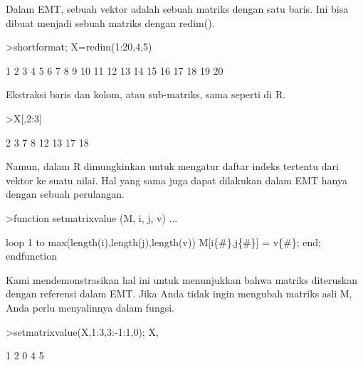 \documentclass[a4paper,10pt]{article}
\begin{document}
\begin{eulernotebook}
\begin{eulercomment}
\begin{eulercomment}
\begin{eulercomment}
\begin{eulercomment}
\begin{eulercomment}
\begin{eulercomment}
\begin{eulercomment}
\begin{eulercomment}
\begin{eulercomment}
\begin{eulercomment}
\begin{eulercomment}
\begin{eulercomment}
\begin{eulercomment}
\begin{eulercomment}
\begin{eulercomment}
\begin{eulercomment}
\begin{eulercomment}
\begin{eulercomment}
\begin{eulercomment}
\begin{eulercomment}
\begin{eulercomment}
\begin{eulercomment}
\begin{eulercomment}
Dalam EMT, sebuah vektor adalah sebuah matriks dengan satu baris. Ini
bisa dibuat menjadi sebuah matriks dengan redim().
\end{eulercomment}
\begin{eulerprompt}
>shortformat; X=redim(1:20,4,5)
\end{eulerprompt}
\begin{euleroutput}
          1         2         3         4         5 
          6         7         8         9        10 
         11        12        13        14        15 
         16        17        18        19        20 
\end{euleroutput}
\begin{eulercomment}
Ekstraksi baris dan kolom, atau sub-matriks, sama seperti di R.
\end{eulercomment}
\begin{eulerprompt}
>X[,2:3]
\end{eulerprompt}
\begin{euleroutput}
          2         3 
          7         8 
         12        13 
         17        18 
\end{euleroutput}
\begin{eulercomment}
Namun, dalam R dimungkinkan untuk mengatur daftar indeks tertentu dari
vektor ke suatu nilai. Hal yang sama juga dapat dilakukan dalam EMT
hanya dengan sebuah perulangan.
\end{eulercomment}
\begin{eulerprompt}
>function setmatrixvalue (M, i, j, v) ...
\end{eulerprompt}
\begin{eulerudf}
  loop 1 to max(length(i),length(j),length(v))
     M[i\{#\},j\{#\}] = v\{#\};
  end;
  endfunction
\end{eulerudf}
\begin{eulercomment}
Kami mendemonstrasikan hal ini untuk menunjukkan bahwa matriks
diteruskan dengan referensi dalam EMT. Jika Anda tidak ingin mengubah
matriks asli M, Anda perlu menyalinnya dalam fungsi.
\end{eulercomment}
\begin{eulerprompt}
>setmatrixvalue(X,1:3,3:-1:1,0); X,
\end{eulerprompt}
\begin{euleroutput}
          1         2         0         4         5 

\end{euleroutput}
\end{eulercomment}
\end{eulercomment}
\end{eulercomment}
\end{eulercomment}
\end{eulercomment}
\end{eulercomment}
\end{eulercomment}
\end{eulercomment}
\end{eulercomment}
\end{eulercomment}
\end{eulercomment}
\end{eulercomment}
\end{eulercomment}
\end{eulercomment}
\end{eulercomment}
\end{eulercomment}
\end{eulercomment}
\end{eulercomment}
\end{eulercomment}
\end{eulercomment}
\end{eulercomment}
\end{eulercomment}
\end{eulernotebook}
\end{document}
